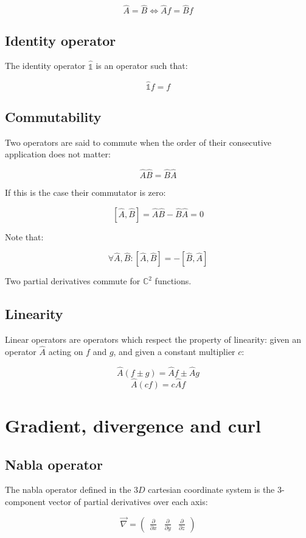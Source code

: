 	$$\hat{A} = \hat{B} \Leftrightarrow \hat{A}f = \hat{B}f$$

	\subsection{Identity operator}
	The identity operator $\hat{\mathds{1}}$ is an operator such that:

	$$\hat{\mathds{1}}f = f$$

	\subsection{Commutability}
	Two operators are said to commute when the order of their consecutive application does not matter:

	$$\hat{A}\hat{B} = \hat{B}\hat{A}$$

	If this is the case their commutator is zero:

	$$[\hat{A}, \hat{B}] = \hat{A}\hat{B}-\hat{B}\hat{A} = 0$$

	Note that:

	$$\forall \hat{A}, \hat{B}: [\hat{A}, \hat{B}] = -[\hat{B}, \hat{A}]$$

	Two partial derivatives commute for $\mathbb{C}^2$ functions.

	\subsection{Linearity}
	Linear operators are operators which respect the property of linearity: given an operator $\hat{A}$ acting on $f$ and $g$, and given a constant multiplier $c$:

	$$\hat{A}(f\pm g) = \hat{A}f\pm \hat{A}g$$
	$$\hat{A}(cf) = c\hat{A}f$$

\section{Gradient, divergence and curl}

	\subsection{Nabla operator}
	The nabla operator defined in the $3D$ cartesian coordinate system is the $3$-component vector of partial derivatives over each axis:

	$$\vec{\nabla} = \begin{pmatrix} \frac{\partial}{\partial x} & \frac{\partial}{\partial y} & \frac{\partial}{\partial z}\end{pmatrix}$$

